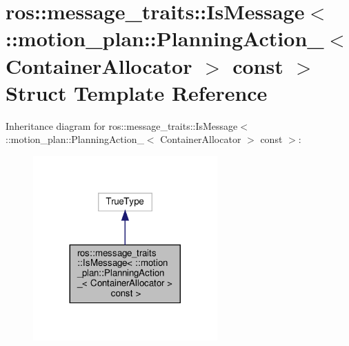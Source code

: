 \hypertarget{structros_1_1message__traits_1_1IsMessage_3_01_1_1motion__plan_1_1PlanningAction___3_01ContainerAllocator_01_4_01const_01_4}{}\section{ros\+:\+:message\+\_\+traits\+:\+:Is\+Message$<$ \+:\+:motion\+\_\+plan\+:\+:Planning\+Action\+\_\+$<$ Container\+Allocator $>$ const $>$ Struct Template Reference}
\label{structros_1_1message__traits_1_1IsMessage_3_01_1_1motion__plan_1_1PlanningAction___3_01ContainerAllocator_01_4_01const_01_4}


Inheritance diagram for ros\+:\+:message\+\_\+traits\+:\+:Is\+Message$<$ \+:\+:motion\+\_\+plan\+:\+:Planning\+Action\+\_\+$<$ Container\+Allocator $>$ const $>$\+:
\nopagebreak
\begin{figure}[H]
\begin{center}
\leavevmode
\includegraphics[width=200pt]{structros_1_1message__traits_1_1IsMessage_3_01_1_1motion__plan_1_1PlanningAction___3_01Container709cad3f67b6ecfb748fe74254eacddf}
\end{center}
\end{figure}


